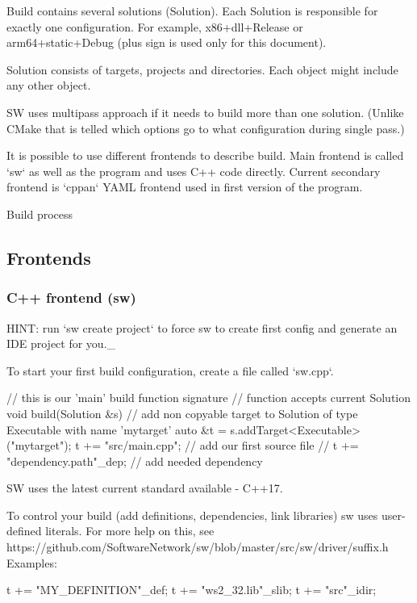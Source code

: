 Build contains several solutions (Solution).
Each Solution is responsible for exactly one configuration. For example, x86+dll+Release or arm64+static+Debug (plus sign is used only for this document).

Solution consists of targets, projects and directories. Each object might include any other object.

SW uses multipass approach if it needs to build more than one solution.
(Unlike CMake that is telled which options go to what configuration during single pass.)

It is possible to use different frontends to describe build.
Main frontend is called `sw` as well as the program and uses C++ code directly.
Current secondary frontend is `cppan` YAML frontend used in first version of the program.

Build process

\subsection{Frontends}

\subsubsection{C++ frontend (sw)}

HINT: run `sw create project` to force sw to create first config and generate an IDE project for you._

To start your first build configuration, create a file called `sw.cpp`.

\begin{swcpp}
// this is our 'main' build function signature
// function accepts current Solution
void build(Solution &s)
{
    // add non copyable target to Solution of type Executable with name 'mytarget'
    auto &t = s.addTarget<Executable>("mytarget");
    t += "src/main.cpp"; // add our first source file
    // t += "dependency.path"_dep; // add needed dependency
}
\end{swcpp}

SW uses the latest current standard available - C++17.

To control your build (add definitions, dependencies, link libraries) sw uses user-defined literals. For more help on this, see https://github.com/SoftwareNetwork/sw/blob/master/src/sw/driver/suffix.h
Examples:

\begin{swcpp}
t += "MY_DEFINITION"_def;
t += "ws2_32.lib"_slib;
t += "src"_idir;
\end{swcpp}

